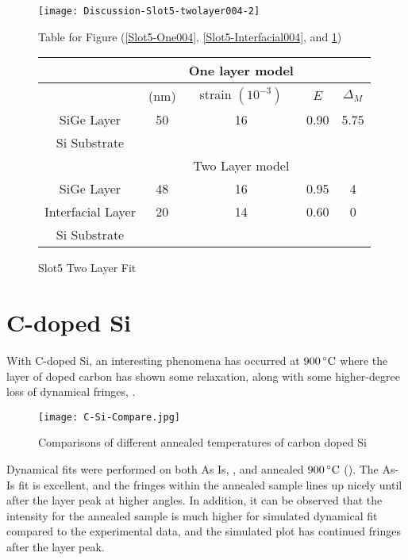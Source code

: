 \begin{figure}[hc]%
\caption{Slot5 Two Layer Fit}
\label{Slot5-2layer}
\begin{minipage}{0.85\linewidth}
\texttt{[image: Discussion-Slot5-twolayer004-2]}
\end{minipage}
\begin{minipage}{\linewidth}
\centering
\vspace{10pt}
Table for Figure (\ref{Slot5-One004}, \ref{Slot5-Interfacial004}, and \ref{Slot5-2layer})\\
\vspace{5pt}
\begin{tabular}{c|cccc}
			& 	&One layer model	 \\
\hline
			&	(nm)	&	strain	 $(10^{-3})$&	$E $ &  $\Delta_M$\\
\hline
SiGe Layer		&  	50	&      16	 & 0.90 & 5.75	\\
Si Substrate		&	\textemdash & \textemdash&\textemdash\ &\textemdash	\\
\hline
			& &Two Layer model \\
\hline
SiGe Layer		&	48	& 16	& 0.95	& 4	\\
Interfacial Layer	&	20	&14	& 0.60		& 0\\	
Si Substrate		&	\textemdash & \textemdash&\textemdash\ &\textemdash
\end{tabular}
\end{minipage}
\end{figure}





\chapter{C-doped Si}

With C-doped Si, an interesting phenomena has occurred at $900\,^{\circ}\mathrm{C} $ where the layer of doped carbon has shown some relaxation, along with some higher-degree loss of dynamical fringes,  .

\begin{figure}[h]
\centering
\caption{Comparisons of different annealed temperatures of carbon doped Si}
\label{C-si-compare}
\texttt{[image: C-Si-Compare.jpg]}
\end{figure}

Dynamical fits were performed on both As Is, , and  annealed $900\,^{\circ}\mathrm{C}$ ().  The As-Is fit is excellent, and the fringes within the annealed sample lines up nicely until after the layer peak at higher angles.  In addition, it can be observed that the intensity for the annealed sample is much higher for simulated dynamical fit compared to the experimental data, and the simulated plot has continued fringes after the layer peak.

